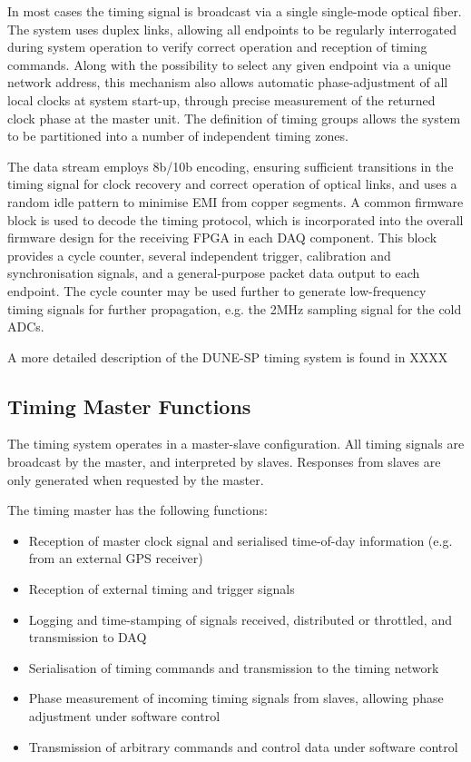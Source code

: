 \documentclass[a4paper,11pt]{article}
\begin{document}
In most cases the timing signal is broadcast via a single single-mode optical fiber. The system uses duplex links, allowing all endpoints
to be regularly interrogated during system operation to verify correct operation
and reception of timing commands. Along with the possibility to select
any given endpoint via a unique network address, this mechanism also allows
automatic phase-adjustment of all local clocks at system start-up,
through precise measurement of the returned clock phase at the master unit. The definition
of timing groups allows the system to be partitioned into a number of
independent timing zones.


The data stream employs 8b/10b encoding, ensuring sufficient transitions in the
timing signal for clock recovery and correct operation of optical links, and uses a random idle 
pattern to minimise EMI from copper segments. A common firmware block is used to
decode the timing protocol, which is incorporated into the overall
firmware design for the receiving FPGA in each DAQ component. This
block provides a cycle counter, several independent trigger, calibration and 
synchronisation signals, and a general-purpose packet data output to each endpoint.
The cycle counter may be used further to generate low-frequency timing signals for
further propagation, e.g. the 2MHz sampling signal for the cold ADCs.

A more detailed description of the DUNE-SP timing system is found in XXXX\cite{ref:dts-sp-description}


\subsection{Timing Master Functions}

The timing system operates in a master-slave configuration. All timing signals are broadcast by the master, and interpreted by slaves. Responses from slaves are only generated when requested by the master.

The timing master has the following functions:

\begin{itemize}
	\item Reception of master clock signal and serialised time-of-day information (e.g. from an external GPS receiver)
	\item Reception of external timing and trigger signals
	\item Logging and time-stamping of signals received, distributed or throttled, and transmission to DAQ
	\item Serialisation of timing commands and transmission to the timing network
	\item Phase measurement of incoming timing signals from slaves, allowing phase adjustment under software control
	\item Transmission of arbitrary commands and control data under software control
\end{itemize}
\end{document}
